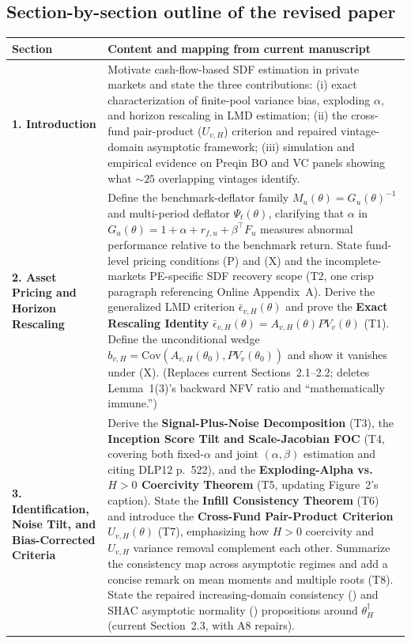 \documentclass[11pt]{article}
\newcommand{\Cov}{\mathrm{Cov}}
\newcommand{\code}[1]{\texttt{\detokenize{#1}}}
\begin{document}
\subsection{Section-by-section outline of the revised paper}

{\small
\begin{longtable}{@{}L{4.0cm}L{11.3cm}@{}}
\toprule
Section & Content and mapping from current manuscript\\
\midrule
\endhead
\textbf{1. Introduction} & Motivate cash-flow-based SDF estimation in private markets and state the three contributions: (i) exact characterization of finite-pool variance bias, exploding $\alpha$, and horizon rescaling in LMD estimation; (ii) the cross-fund pair-product ($U_{v,H}$) criterion and repaired vintage-domain asymptotic framework; (iii) simulation and empirical evidence on Preqin BO and VC panels showing what $\sim 25$ overlapping vintages identify.\\
\textbf{2. Asset Pricing and Horizon Rescaling} & Define the benchmark-deflator family $M_u(\theta)=G_u(\theta)^{-1}$ and multi-period deflator $\Psi_t(\theta)$, clarifying that $\alpha$ in $G_u(\theta)=1+\alpha+r_{f,u}+\beta^\top F_u$ measures abnormal performance relative to the benchmark return. State fund-level pricing conditions (P) and (X) and the incomplete-markets PE-specific SDF recovery scope (T2, one crisp paragraph referencing Online Appendix~A). Derive the generalized LMD criterion $\bar\epsilon_{v,H}(\theta)$ and prove the \textbf{Exact Rescaling Identity} $\bar\epsilon_{v,H}(\theta)=A_{v,H}(\theta)PV_v(\theta)$ (T1). Define the unconditional wedge $b_{v,H}=\Cov(A_{v,H}(\theta_0),PV_v(\theta_0))$ and show it vanishes under (X). (Replaces current Sections~2.1--2.2; deletes Lemma~1(3)'s backward NFV ratio and ``mathematically immune.'')\\
\textbf{3. Identification, Noise Tilt, and Bias-Corrected Criteria} & Derive the \textbf{Signal-Plus-Noise Decomposition} (T3), the \textbf{Inception Score Tilt and Scale-Jacobian FOC} (T4, covering both fixed-$\alpha$ and joint $(\alpha,\beta)$ estimation and citing DLP12 p.~522), and the \textbf{Exploding-Alpha vs.\ $H>0$ Coercivity Theorem} (T5, updating Figure~2's caption). State the \textbf{Infill Consistency Theorem} (T6) and introduce the \textbf{Cross-Fund Pair-Product Criterion} $U_{v,H}(\theta)$ (T7), emphasizing how $H>0$ coercivity and $U_{v,H}$ variance removal complement each other. Summarize the consistency map across asymptotic regimes and add a concise remark on mean moments and multiple roots (T8). State the repaired increasing-domain consistency (\code{prop:consistency_H}) and SHAC asymptotic normality (\code{prop:clt_H}) propositions around $\theta_H^\dagger$ (current Section~2.3, with A8 repairs).\\

\end{longtable}}
\end{document}
